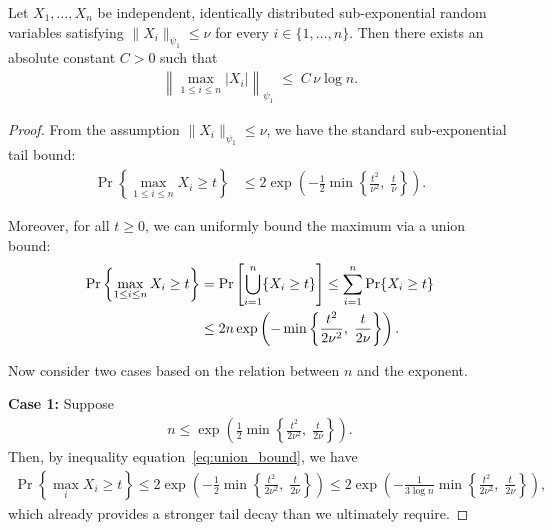 \documentclass[10pt,a4paper]{amsart}
\def\eqref#1{equation~\ref{#1}}
\begin{document}
\begin{lemma}\label{lem:max_subexp}
Let \(X_1,\dots,X_n\) be independent, identically distributed sub-exponential
random variables satisfying \(\|X_i\|_{\psi_1}\le\nu\) for every
\(i \in \{1,\dots,n\}\).  
Then there exists an absolute constant \(C>0\) such that
\begin{align*}
    \left\|\max_{1\le i\le n}\lvert X_i\rvert\right\|_{\psi_1}
    \;\le\; C\,\nu\log n .
\end{align*}
\end{lemma}

\begin{proof}
From the assumption \( \|X_i\|_{\psi_1} \leq \nu \), we have the standard sub-exponential tail bound:
\begin{align*}
    \Pr\left\{ \max_{1 \le i \le n} X_i \ge t \right\}
    &\le
    2\exp\left(
        -\frac{1}{2} \min\left\{
            \frac{t^2}{\nu^2},\;
            \frac{t}{\nu}
        \right\}
    \right).
\end{align*}

Moreover, for all \( t \ge 0 \), we can uniformly bound the maximum via a union bound:
\begin{align}
    \Pr\left\{ \max_{1 \le i \le n} X_i \ge t \right\}
    &= \Pr\left[ \bigcup_{i=1}^{n} \{ X_i \ge t \} \right]
    \le \sum_{i=1}^{n} \Pr\{ X_i \ge t \} \notag \\
    &\le
    2n \exp\left(
        -\min\left\{
            \frac{t^2}{2\nu^{2}},\;
            \frac{t}{2\nu}
        \right\}
    \right).
    \label{eq:union_bound}
\end{align}

Now consider two cases based on the relation between \( n \) and the exponent.

\smallskip
\textbf{Case 1:} Suppose
\begin{align*}
    n \le \exp\left(
        \frac{1}{2} \min\left\{
            \frac{t^2}{2\nu^{2}},\;
            \frac{t}{2\nu}
        \right\}
    \right).
\end{align*}
Then, by inequality \eqref{eq:union_bound}, we have
\begin{align*}
    \Pr\left\{ \max_{i} X_i \ge t \right\}
    \le
    2\exp\left(
        -\frac{1}{2} \min\left\{
            \frac{t^2}{2\nu^2},\;
            \frac{t}{2\nu}
        \right\}
    \right)
    \le
    2\exp\left(
        -\frac{1}{3\log n}
        \min\left\{
            \frac{t^2}{2\nu^2},\;
            \frac{t}{2\nu}
        \right\}
    \right),
\end{align*}
which already provides a stronger tail decay than we ultimately require.


\end{proof}
\end{document}
